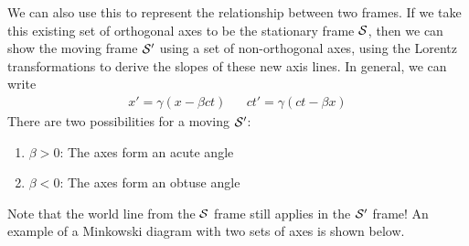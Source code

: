 \documentclass[a4paper]{article}
\begin{document}
\begin{center}                                                                
\end{center}   

We can also use this to represent the relationship between two frames.
If we take this existing set of orthogonal axes to be the stationary frame
$\S$, then we can show the moving frame $\S'$ using a set of non-orthogonal
axes, using the Lorentz transformations to derive the slopes of these new
axis lines. In general, we can write
\begin{align*}
	x'=\gamma(x-\beta ct) && ct' = \gamma(ct-\beta x)
\end{align*}
There are two possibilities for a moving $\S'$:
\begin{enumerate}
	\item $\beta > 0$: The axes form an acute angle
	\item $\beta < 0$: The axes form an obtuse angle
\end{enumerate}
Note that the world line from the $\S$ frame still applies in the $\S'$ frame!
An example of a Minkowski diagram with two sets of axes is shown below.
\begin{center}                                                                  
\end{center}
\end{document}
